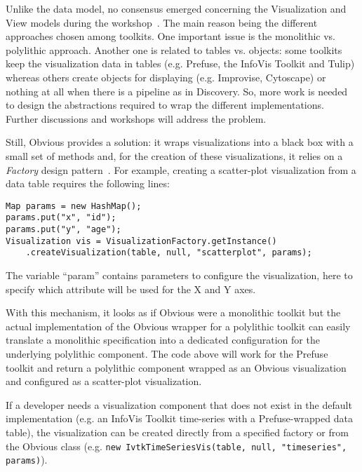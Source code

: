 Unlike the data model, no consensus emerged concerning the
Visualization and View models during the
workshop~\cite{vismaster2008}.  The main reason being the different
approaches chosen among toolkits.  One important issue is the
monolithic vs. polylithic approach. Another one is related to tables
vs. objects: some toolkits keep the visualization data in tables
(e.g. Prefuse, the InfoVis Toolkit and Tulip) whereas others create
objects for displaying (e.g. Improvise, Cytoscape) or nothing at all
when there is a pipeline as in Discovery.  So, more work is needed to
design the abstractions required to wrap the different
implementations.  Further discussions and workshops will address the
problem.

Still, Obvious provides a solution: it wraps visualizations into a
black box with a small set of methods and, for the creation of these
visualizations, it relies on a \emph{Factory} design
pattern~\cite{DesignPatterns}.  For example, creating a scatter-plot
visualization from a data table requires the following lines:
\begin{lstlisting}
Map params = new HashMap();
params.put("x", "id");
params.put("y", "age");
Visualization vis = VisualizationFactory.getInstance()
    .createVisualization(table, null, "scatterplot", params);
\end{lstlisting}
The variable ``param'' contains parameters to configure the
visualization, here to specify which attribute will be used for the X
and Y axes.

With this mechanism, it looks as if Obvious were a monolithic toolkit
but the actual implementation of the Obvious wrapper for a polylithic
toolkit can easily translate a monolithic specification into a
dedicated configuration for the underlying polylithic component.  The
code above will work for the Prefuse toolkit and return a polylithic
component wrapped as an Obvious visualization and configured as a
scatter-plot visualization.

If a developer needs a visualization component that does not exist in
the default implementation (e.g. an InfoVis Toolkit time-series with a
Prefuse-wrapped data table), the visualization can be created directly
from a specified factory or from the Obvious class
(e.g. \lstinline!new IvtkTimeSeriesVis(table, null, "timeseries", params)!).



